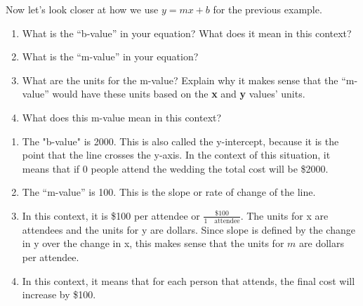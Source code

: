 \documentclass{ximera}
\begin{document}
\begin{example}
Now let's look closer at how we use $y=mx+b$ for the previous example.
\begin{enumerate}
\item  What is the ``b-value'' in your equation?  What does it mean in this context?
\item  What is the ``m-value'' in your equation?
\item  What are the units for the m-value?  Explain why it makes sense that the ``m-value'' would have these units based on the \textbf{x} and \textbf{y} values' units.
\item What does this m-value mean in this context?
\end{enumerate}
\begin{explanation}
\begin{enumerate}
\item The "b-value" is 2000. This is also called the y-intercept, because it is the point that the line crosses the y-axis. In the context of this situation, it means that if 0 people attend the wedding the total cost will be \$2000.
\item The ``m-value'' is 100. This is the slope or rate of change of the line.
\item In this context, it is \$100 per attendee or $\frac{\$100}{1 \quad \text{attendee}}$.  The units for x are attendees and the units for y are dollars. Since slope is defined by the change in y over the change in x, this makes sense that the units for $m$ are dollars per attendee.
\item In this context, it means that for each person that attends, the final cost will increase by \$100.
\end{enumerate}
\end{explanation}
\end{example}
\end{document}
